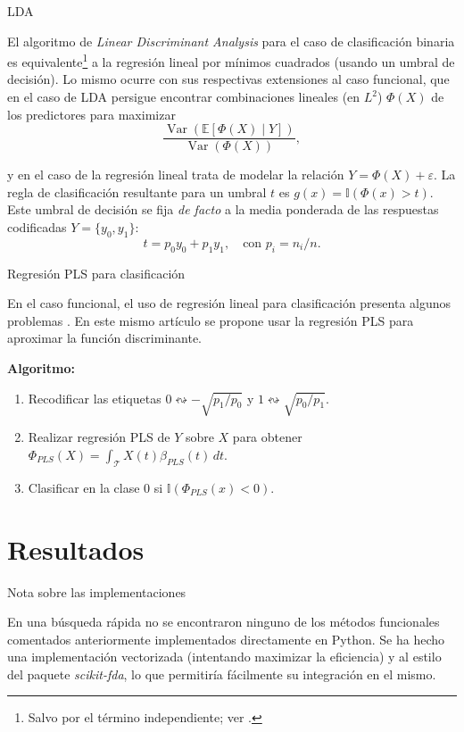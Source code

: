 \documentclass[10pt, professionalfonts]{beamer}
\begin{document}
\begin{frame}{LDA}

El algoritmo de \textit{Linear Discriminant Analysis} para el caso de clasificación binaria es equivalente{\footnote{Salvo por el término independiente; ver \textcite{hart2000pattern, mika2003kernel, gareth2013introduction}.}} a la regresión lineal por mínimos cuadrados (usando un umbral de decisión). Lo mismo ocurre con sus respectivas extensiones al caso funcional, que en el caso de LDA persigue encontrar combinaciones lineales (en $L^2$) $\Phi(X)$ de los predictores para maximizar
\[
\frac{\operatorname{Var}(\mathbb E[\Phi(X)\mid Y ])}{\operatorname{Var}(\Phi(X))},
\]

y en el caso de la regresión lineal trata de modelar la relación $Y=\Phi(X)+\varepsilon$. La regla de clasificación resultante para un umbral $t$ es $g(x) = \mathbb I(\Phi(x) > t)$. Este umbral de decisión se fija \textit{de facto} a la media ponderada de las respuestas codificadas $Y=\{y_0, y_1\}$:
\[
t = p_0y_0 + p_1y_1, \quad \text{con } p_i = n_i/n.
\]

\end{frame}

\begin{frame}{Regresión PLS para clasificación}

En el caso funcional, el uso de regresión lineal para clasificación presenta algunos problemas \parencite[y referencias contenidas]{preda2005pls}. En este mismo artículo se propone usar la regresión PLS para aproximar la función discriminante.
\vspace{1em}

\textbf{Algoritmo:}
\begin{enumerate}
  \item Recodificar las etiquetas $0 \leftrightsquigarrow -\sqrt{p_1/p_0}$ y $1 \leftrightsquigarrow \sqrt{p_0/p_1}$.
  \item Realizar regresión PLS de $Y$ sobre $X$ para obtener $\Phi_{PLS}(X) = \int_{\mathcal T}X(t)\beta_{PLS}(t)\, dt$.
  \item Clasificar en la clase 0 si $\mathbb I(\Phi_{PLS}(x) < 0)$.
\end{enumerate}
\end{frame}

\section{Resultados}

\begin{frame}{Nota sobre las implementaciones}

En una búsqueda rápida no se encontraron ninguno de los métodos funcionales comentados anteriormente implementados directamente en Python. Se ha hecho una implementación vectorizada (intentando maximizar la eficiencia) y al estilo del paquete \textit{scikit-fda}, lo que permitiría fácilmente su integración en el mismo.

\end{frame}
\end{document}
